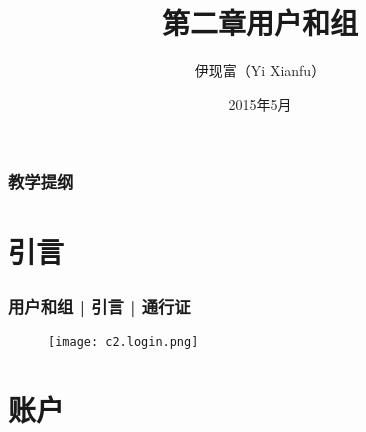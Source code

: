 



\title[用户和组]{第二章\quad 用户和组}
\author[Yixf]{伊现富（Yi Xianfu）}
\date{2015年5月}


\begin{frame}
  \titlepage
\end{frame}

\begin{frame}[plain,label=current]
  \frametitle{教学提纲}
  \setcounter{tocdepth}{3}
  \begin{multicols}{2}
    \tableofcontents
  \end{multicols}
\end{frame}

\section{引言}
\begin{frame}
  \frametitle{用户和组 | 引言 | 通行证}
  \begin{figure}
    \centering
    \texttt{[image: c2.login.png]}
  \end{figure}
\end{frame}

\section{账户}
